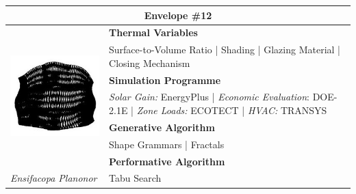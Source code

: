 \begin{table}
	\begin{tabular}{ | m{6cm} | m{14cm} |}
	\toprule
	\multicolumn{2}{c}{Envelope \#{}12} \\[1cm] \hline
	\multirow{7}{*}{\includegraphics[width=5.5cm]{./Images/21-Envelope12}} & \textbf{Thermal Variables} \\[1cm]
	& Surface-to-Volume Ratio | Shading | Glazing Material | Closing Mechanism\vspace{0.5cm}\\ \cline{2-2}
		 & \textbf{Simulation Programme} \\[1cm]
		 & \emph{Solar Gain:} EnergyPlus | \emph{Economic Evaluation}: DOE-2.1E | \emph{Zone Loads:} ECOTECT | \emph{HVAC:} TRANSYS \vspace{0.5cm}\\ \cline{2-2}
		 & \textbf{Generative Algorithm} \\[1cm]
		 & Shape Grammars | Fractals\vspace{0.5cm}\\ \cline{2-2}
		 & \textbf{Performative Algorithm} \\[1cm]
		 \emph{Ensifacopa Planonor} &  Tabu Search\vspace{0.5cm}\\
	\bottomrule
	\end{tabular}
\end{table}

\clearpage


